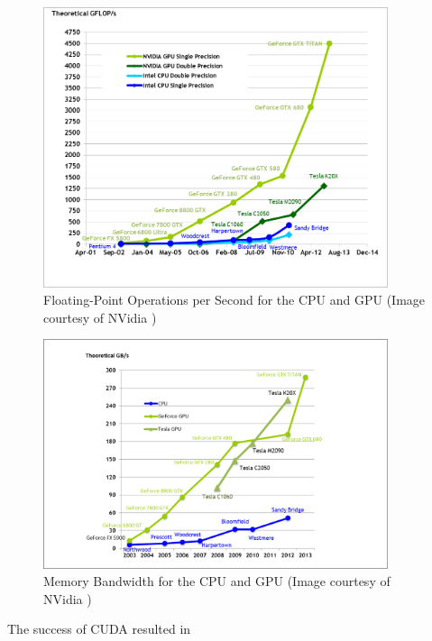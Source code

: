 \documentclass{report}
\begin{document}
\begin{figure}
\centering
\includegraphics[width=0.9\textwidth]{gpu_content/nvidia_figures/floating-point-operations-per-second.png}
\caption{Floating-Point Operations per Second for the CPU and GPU (Image courtesy of NVidia \cite{CudaGuide2013})} 
\label{fig:floating-point-operations-per-second}
\end{figure}


\begin{figure}
\centering
\includegraphics[width=0.9\textwidth]{gpu_content/nvidia_figures/memory-bandwidth.png}
\caption{Memory Bandwidth for the CPU and GPU (Image courtesy of NVidia \cite{CudaGuide2013})} 
\label{fig:memory-bandwidth}
\end{figure}



The success of CUDA resulted in 
\end{document}
